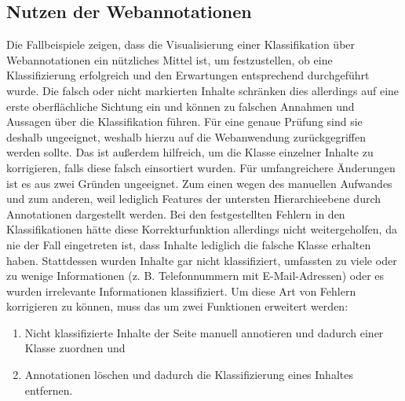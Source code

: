 \subsection{Nutzen der Webannotationen}
    Die Fallbeispiele zeigen, dass die Visualisierung einer Klassifikation
    über Webannotationen ein nützliches Mittel ist, um festzustellen,
    ob eine Klassifizierung erfolgreich und den Erwartungen entsprechend durchgeführt wurde.
    Die falsch oder nicht markierten Inhalte schränken dies allerdings
    auf eine erste oberflächliche Sichtung ein
    und können zu falschen Annahmen und Aussagen über die Klassifikation führen.
    Für eine genaue Prüfung sind sie deshalb ungeeignet,
    weshalb hierzu auf die Webanwendung zurückgegriffen werden sollte.
    Das {\annotatorPlugin} ist außerdem hilfreich,
    um die Klasse einzelner Inhalte zu korrigieren,
    falls diese falsch einsortiert wurden.
    Für umfangreichere Änderungen ist es aus zwei Gründen ungeeignet.
    Zum einen wegen des manuellen Aufwandes
    und zum anderen, weil lediglich Features der untersten Hierarchieebene
    durch Annotationen dargestellt werden.
    Bei den festgestellten Fehlern in den Klassifikationen hätte diese
    Korrekturfunktion allerdings nicht weitergeholfen,
    da nie der Fall eingetreten ist, dass Inhalte lediglich die falsche Klasse erhalten haben.
    Stattdessen wurden Inhalte gar nicht klassifiziert,
    umfassten zu viele oder zu wenige Informationen
    (z. B. Telefonnummern mit E-Mail-Adressen)
    oder es wurden irrelevante Informationen klassifiziert.
    Um diese Art von Fehlern korrigieren zu können,
    muss das {\annotatorPlugin} um zwei Funktionen erweitert werden:

    \begin{enumerate}
        \item Nicht klassifizierte Inhalte der Seite manuell annotieren und dadurch einer Klasse zuordnen und
        \item Annotationen löschen und dadurch die Klassifizierung eines Inhaltes entfernen.
    \end{enumerate}